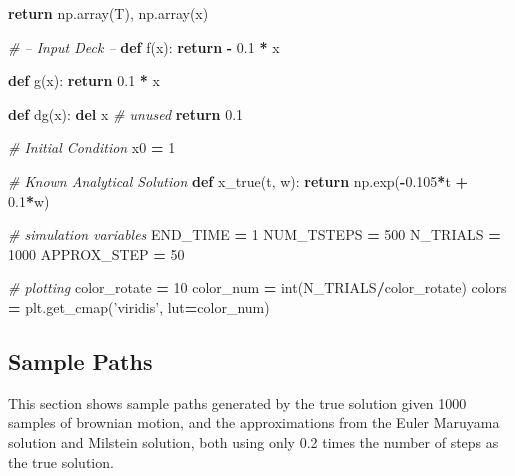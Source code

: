 \documentclass[]{article}
\newenvironment{Shaded}{\begin{snugshade}}{\end{snugshade}}
\newcommand{\BuiltInTok}[1]{#1}
\newcommand{\CommentTok}[1]{\textcolor[rgb]{0.56,0.35,0.01}{\textit{#1}}}
\newcommand{\ControlFlowTok}[1]{\textcolor[rgb]{0.13,0.29,0.53}{\textbf{#1}}}
\newcommand{\DecValTok}[1]{\textcolor[rgb]{0.00,0.00,0.81}{#1}}
\newcommand{\FloatTok}[1]{\textcolor[rgb]{0.00,0.00,0.81}{#1}}
\newcommand{\KeywordTok}[1]{\textcolor[rgb]{0.13,0.29,0.53}{\textbf{#1}}}
\newcommand{\NormalTok}[1]{#1}
\newcommand{\OperatorTok}[1]{\textcolor[rgb]{0.81,0.36,0.00}{\textbf{#1}}}
\newcommand{\StringTok}[1]{\textcolor[rgb]{0.31,0.60,0.02}{#1}}
\begin{document}
\begin{Shaded}
\begin{Highlighting}[]
    \ControlFlowTok{return}\NormalTok{ np.array(T), np.array(x)}


\CommentTok{# -- Input Deck --}
\KeywordTok{def}\NormalTok{ f(x):}
    \ControlFlowTok{return} \OperatorTok{-} \FloatTok{0.1} \OperatorTok{*}\NormalTok{ x}


\KeywordTok{def}\NormalTok{ g(x):}
    \ControlFlowTok{return} \FloatTok{0.1} \OperatorTok{*}\NormalTok{ x}


\KeywordTok{def}\NormalTok{ dg(x):}
    \KeywordTok{del}\NormalTok{ x  }\CommentTok{# unused}
    \ControlFlowTok{return} \FloatTok{0.1}


\CommentTok{# Initial Condition}
\NormalTok{x0 }\OperatorTok{=} \DecValTok{1}

\CommentTok{# Known Analytical Solution}
\KeywordTok{def}\NormalTok{ x_true(t, w):}
    \ControlFlowTok{return}\NormalTok{ np.exp(}\OperatorTok{-}\FloatTok{0.105}\OperatorTok{*}\NormalTok{t }\OperatorTok{+} \FloatTok{0.1}\OperatorTok{*}\NormalTok{w)}


\CommentTok{# simulation variables}
\NormalTok{END_TIME }\OperatorTok{=} \DecValTok{1}
\NormalTok{NUM_TSTEPS }\OperatorTok{=} \DecValTok{500}
\NormalTok{N_TRIALS }\OperatorTok{=} \DecValTok{1000}
\NormalTok{APPROX_STEP }\OperatorTok{=} \DecValTok{50}

\CommentTok{# plotting}
\NormalTok{color_rotate }\OperatorTok{=} \DecValTok{10}
\NormalTok{color_num }\OperatorTok{=} \BuiltInTok{int}\NormalTok{(N_TRIALS}\OperatorTok{/}\NormalTok{color_rotate)}
\NormalTok{colors }\OperatorTok{=}\NormalTok{ plt.get_cmap(}\StringTok{'viridis'}\NormalTok{, lut}\OperatorTok{=}\NormalTok{color_num)}
\end{Highlighting}
\end{Shaded}

\hypertarget{sample-paths}{%
\subsection{Sample Paths}\label{sample-paths}}

This section shows sample paths generated by the true solution given
1000 samples of brownian motion, and the approximations from the Euler
Maruyama solution and Milstein solution, both using only 0.2 times the
number of steps as the true solution.
\end{document}
